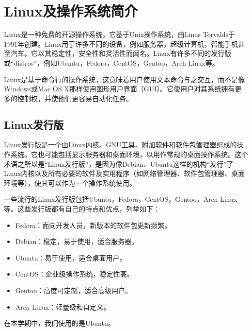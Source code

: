 \chapter{Linux及操作系统简介}

Linux是一种免费的开源操作系统。它基于Unix操作系统，由Linus Torvalds于1991年创建。Linux用于许多不同的设备，例如服务器，超级计算机，智能手机甚至汽车。它以其稳定性，安全性和灵活性而闻名。Linux有许多不同的发行版或“distros”，例如Ubuntu，Fedora，CentOS，Gentoo，Arch Linux等。

Linux是基于命令行的操作系统，这意味着用户使用文本命令与之交互，而不是像Windows或Mac OS X那样使用图形用户界面（GUI）。它使用户对其系统拥有更多的控制权，并使他们更容易自动化任务。

\section{Linux发行版}
Linux发行版是一个由Linux内核、GNU工具、附加软件和软件包管理器组成的操作系统。它也可能包括显示服务器和桌面环境，以用作常规的桌面操作系统。这个术语之所以是“Linux发行版”，是因为像Debian、Ubuntu这样的机构“发行”了Linux内核以及所有必要的软件及实用程序（如网络管理器、软件包管理器、桌面环境等），使其可以作为一个操作系统使用。

一些流行的Linux发行版包括Ubuntu，Fedora，CentOS，Gentoo，Arch Linux等。这些发行版都有自己的特点和优点，列举如下：
\begin{itemize}
    \item Fedora：面向开发人员，新版本的软件包更新频繁。
    \item Debian：稳定，易于使用，适合服务器。
    \item Ubuntu：易于使用，适合桌面用户。
    \item CentOS：企业级操作系统，稳定性高。
    \item Gentoo：高度可定制，适合高级用户。
    \item Arch Linux：轻量级和自定义。
\end{itemize}

在本学期中，我们使用的是Ubuntu。
